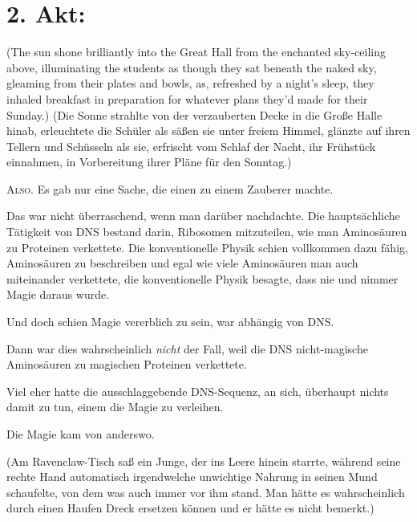 \section{2. Akt:}
(The sun shone brilliantly into the Great Hall from the enchanted sky-ceiling above, illuminating the students as though they sat beneath the naked sky, gleaming from their plates and bowls, as, refreshed by a night’s sleep, they inhaled breakfast in preparation for whatever plans they’d made for their Sunday.)
(Die Sonne strahlte von der verzauberten Decke in die Große Halle hinab, erleuchtete die Schüler als säßen sie unter freiem Himmel, glänzte auf ihren Tellern und Schüsseln als sie, erfrischt vom Schlaf der Nacht, ihr Frühstück einnahmen, in Vorbereitung ihrer Pläne für den Sonntag.)

\lettrine{A}{lso.} Es gab nur eine Sache, die einen zu einem Zauberer machte.

Das war nicht überraschend, wenn man darüber nachdachte. Die hauptsächliche Tätigkeit von DNS bestand darin, Ribosomen mitzuteilen, wie man Aminosäuren zu Proteinen verkettete. Die konventionelle Physik schien vollkommen dazu fähig, Aminosäuren zu beschreiben und egal wie viele Aminosäuren man auch miteinander verkettete, die konventionelle Physik besagte, dass nie und nimmer Magie daraus wurde.

Und doch schien Magie vererblich zu sein, war abhängig von DNS.

Dann war dies wahrscheinlich \emph{nicht} der Fall, weil die DNS nicht-magische Aminosäuren zu magischen Proteinen verkettete.

Viel eher hatte die ausschlaggebende DNS-Sequenz, an sich, überhaupt nichts damit zu tun, einem die Magie zu verleihen.

Die Magie kam von anderswo.

(Am Ravenclaw-Tisch saß ein Junge, der ins Leere hinein starrte, während seine rechte Hand automatisch irgendwelche unwichtige Nahrung in seinen Mund schaufelte, von dem was auch immer vor ihm stand. Man hätte es wahrscheinlich durch einen Haufen Dreck ersetzen können und er hätte es nicht bemerkt.)


